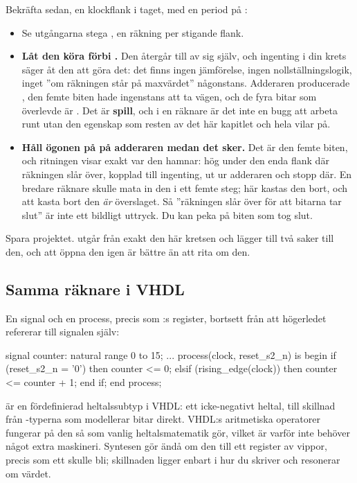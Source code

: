 Bekräfta sedan, en klockflank i taget, med en period på :
\begin{itemize}
  \item Se utgångarna stega , en räkning per stigande flank.
  \item \textbf{Låt den köra förbi .} Den återgår till  av sig själv, och
    ingenting i din krets säger åt den att göra det: det finns ingen jämförelse, ingen
    nollställningslogik, inget ”om räkningen står på maxvärdet” någonstans. Adderaren producerade
    , den femte biten hade ingenstans att ta vägen, och de fyra bitar som överlevde är
    . Det är \textbf{spill}, och i en räknare är det inte en bugg att arbeta runt utan
    den egenskap som resten av det här kapitlet och hela  vilar på.
  \item \textbf{Håll ögonen på  på adderaren medan det sker.} Det är den femte
    biten, och ritningen visar exakt var den hamnar: hög under den enda flank där räkningen slår
    över, kopplad till ingenting, ut ur adderaren och stopp där. En bredare räknare skulle mata in
    den i ett femte steg; här kastas den bort, och att kasta bort den \emph{är} överslaget. Så
    ”räkningen slår över för att bitarna tar slut” är inte ett bildligt uttryck. Du kan peka på
    biten som tog slut.
\end{itemize}

Spara projektet.  utgår från exakt den här kretsen och lägger till två saker till
den, och att öppna den igen är bättre än att rita om den.

\subsection*{Samma räknare i VHDL}
En signal och en process, precis som :s register, bortsett från att högerledet
refererar till signalen själv:

\begin{vhdlcode}
signal counter: natural range 0 to 15;
...
process(clock, reset_s2_n) is
begin
    if (reset_s2_n = '0') then
        counter <= 0;
    elsif (rising_edge(clock)) then
        counter <= counter + 1;
    end if;
end process;
\end{vhdlcode}

 är en fördefinierad heltalssubtyp i VHDL: ett icke-negativt heltal, till skillnad
från -typerna som modellerar bitar direkt. VHDL:s aritmetiska operatorer fungerar på
den så som vanlig heltalsmatematik gör, vilket är varför  inte behöver något
extra maskineri. Syntesen gör ändå om den till ett register av vippor, precis som ett
 skulle bli; skillnaden ligger enbart i hur du skriver och resonerar om
värdet.


